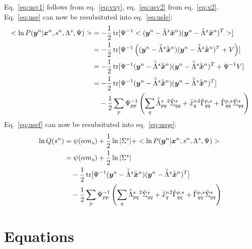 \documentclass[a4paper]{article}
\begin{document}
Eq.~\ref{eq:usv1} follows from eq.~\ref{eq:vxy}, eq.~\ref{eq:usv2} from eq.~\ref{eq:x2}. \\
Eq.~\ref{eq:use} can now be resubsituted into eq.~\ref{eq:usle}:
\begin{align}
  <\ln P(\Xy|\Xx,\Xs,\Xl,\Psi)>
  &=-\frac{1}{2}\Xtr[\Xpsii <(\Xy-\Xlt\Xxt)(\Xy-\Xlt\Xxt)^T>] \\
  &=-\frac{1}{2}\Xtr[\Xpsii \left((\Xy-\Xltm\Xxtm)(\Xy-\Xltm\Xxtm)^T+V\right)] \\
  &=-\frac{1}{2}\Xtr[\Xpsii(\Xy-\Xltm\Xxtm)(\Xy-\Xltm\Xxtm)^T + \Xpsii V] \\
  &=-\frac{1}{2}\Xtr[\Xpsii(\Xy-\Xltm\Xxtm)(\Xy-\Xltm\Xxtm)^T] \nonumber \\
  &\quad-\frac{1}{2}\sum_p\Xpsii_{pp}\left(\sum_q\Xltmpq{}^2\Xxtv_{qq}+\Xxtmq{}^2\Xltvp_{qq}+\Xltvp_{qq}\Xxtv_{qq}\right) \label{eq:usef}
\end{align}
Eq.~\ref{eq:usef} can now be resubsituted into eq.~\ref{eq:usqe}:
\begin{align}
  \ln Q(\Xs)
  &=\psi(\alpha m_s)+\frac{1}{2}\ln |\Xxv|+<\ln P(\Xy|\Xx,\Xs,\Xl,\Psi)> \\
  &=\psi(\alpha m_s)+\frac{1}{2}\ln |\Xxv| \nonumber \\
  &\quad-\frac{1}{2}\Xtr[\Xpsii(\Xy-\Xltm\Xxtm)(\Xy-\Xltm\Xxtm)^T] \nonumber \\
  &\quad-\frac{1}{2}\sum_p\Xpsii_{pp}\left(\sum_q\Xltmpq{}^2\Xxtv_{qq}+\Xxtmq{}^2\Xltvp_{qq}+\Xltvp_{qq}\Xxtv_{qq}\right)
\end{align}

\section{Equations}
\newcommand{\Xvx}{\bs{x}}
\newcommand{\Xvy}{\bs{y}}
\end{document}
